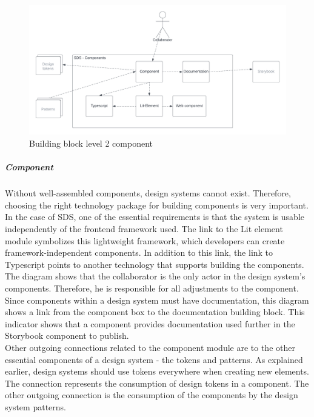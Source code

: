 \begin{figure}[htbp]
    \centerline{
    \includegraphics[width=\linewidth]{images/building_block_view_level_2_component.png}}
\caption{Building block level 2 component}
\label{building_block_level_2_component_sds}
\end{figure}
\subparagraph{Component} \label{sds-component}
Without well-assembled components, design systems cannot exist. Therefore, choosing the right technology package for building components is very important. In the case of \ac{SDS}, one of the essential requirements is that the system is usable independently of the frontend framework used. The link to the Lit element module symbolizes this lightweight framework, which developers can create framework-independent components. In addition to this link, the link to Typescript points to another technology that supports building the components.  \\
The diagram shows that the collaborator is the only actor in the design system's components. Therefore, he is responsible for all adjustments to the component. \\
Since components within a design system must have documentation, this diagram shows a link from the component box to the documentation building block. This indicator shows that a component provides documentation used further in the Storybook component to publish. \\
Other outgoing connections related to the component module are to the other essential components of a design system - the tokens and patterns. As explained earlier, design systems should use tokens everywhere when creating new elements. The connection represents the consumption of design tokens in a component. The other outgoing connection is the consumption of the components by the design system patterns. \\

